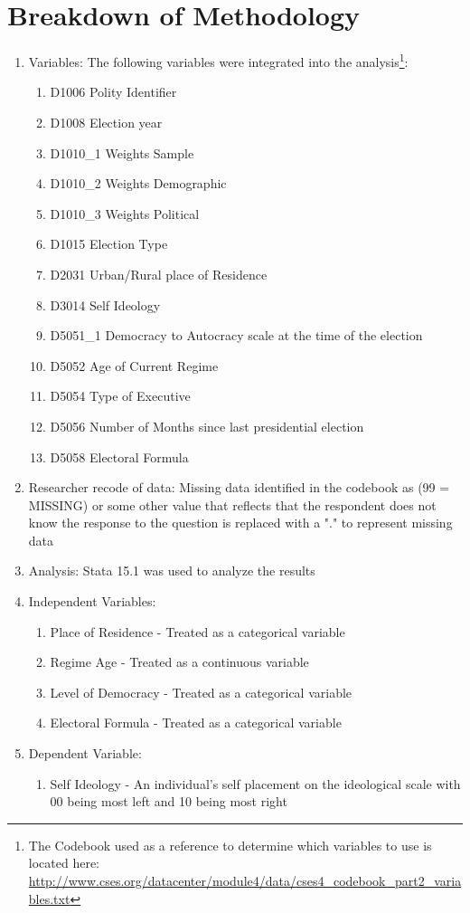 \documentclass[12pt]{article}
\begin{document}
\section{Breakdown of Methodology}

\begin{enumerate}
\item Variables: The following variables were integrated into the analysis\footnote{The Codebook used as a reference to determine which variables to use is located here: \url{http://www.cses.org/datacenter/module4/data/cses4_codebook_part2_variables.txt}}:
\begin{enumerate}
	\item D1006 Polity Identifier
	\item D1008 Election year
	\item D1010\_1 Weights Sample
	\item D1010\_2 Weights Demographic
	\item D1010\_3 Weights Political 
	\item D1015 Election Type
	\item D2031 Urban/Rural place of Residence
	\item D3014 Self Ideology
	\item D5051\_1 Democracy to Autocracy scale at the time of the election
	\item D5052 Age of Current Regime
	\item D5054 Type of Executive
	\item D5056 Number of Months since last presidential election
	\item D5058 Electoral Formula
\end{enumerate} 
\item Researcher recode of data: Missing data identified in the codebook as (99 = MISSING) or some other value that reflects that the respondent does not know the response to the question is replaced with a "." to represent missing data
\item Analysis: Stata 15.1 was used to analyze the results
\item Independent Variables:
\begin{enumerate}
	\item Place of Residence - Treated as a categorical variable
	\item Regime Age - Treated as a continuous variable
	\item Level of Democracy - Treated as a categorical variable
	\item Electoral Formula - Treated as a categorical variable
\end{enumerate}
\item Dependent Variable:
\begin{enumerate}
	\item Self Ideology - An individual's self placement on the ideological scale with 00 being most left and 10 being most right
\end{enumerate}
\end{enumerate}

\clearpage
\nocite{*}


\end{document}
